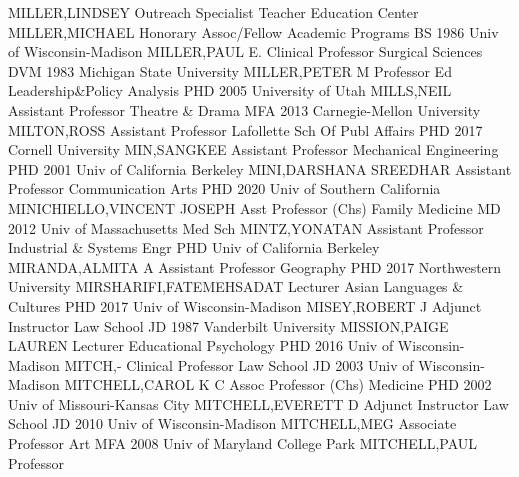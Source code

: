 \documentclass[
]{article}
\begin{document}
\textbar MILLER,LINDSEY \textbar Outreach Specialist \textbar{}
 \textbar Teacher Education Center \textbar MILLER,MICHAEL
\textbar Honorary Assoc/Fellow \textbar Academic Programs \textbar{}
 \textbar BS 1986 Univ of Wisconsin-Madison
\textbar MILLER,PAUL E. \textbar Clinical Professor \textbar Surgical
Sciences \textbar{}  \textbar DVM 1983 Michigan State
University \textbar MILLER,PETER M \textbar Professor \textbar Ed
Leadership\&Policy Analysis \textbar{}  \textbar PHD 2005
University of Utah \textbar MILLS,NEIL \textbar Assistant Professor
\textbar Theatre \& Drama \textbar{}  \textbar MFA 2013
Carnegie-Mellon University \textbar MILTON,ROSS \textbar Assistant
Professor \textbar Lafollette Sch Of Publ Affairs \textbar{}
 \textbar PHD 2017 Cornell University \textbar MIN,SANGKEE
\textbar Assistant Professor \textbar Mechanical Engineering \textbar{}
 \textbar PHD 2001 Univ of California Berkeley
\textbar MINI,DARSHANA SREEDHAR \textbar Assistant Professor
\textbar Communication Arts \textbar{}  \textbar PHD 2020
Univ of Southern California \textbar MINICHIELLO,VINCENT JOSEPH
\textbar Asst Professor (Chs) \textbar Family Medicine \textbar{}
 \textbar MD 2012 Univ of Massachusetts Med Sch
\textbar MINTZ,YONATAN \textbar Assistant Professor \textbar Industrial
\& Systems Engr \textbar{}  \textbar PHD Univ of California
Berkeley \textbar MIRANDA,ALMITA A \textbar Assistant Professor
\textbar Geography \textbar{}  \textbar PHD 2017
Northwestern University \textbar MIRSHARIFI,FATEMEHSADAT
\textbar Lecturer \textbar Asian Languages \& Cultures \textbar{}
 \textbar PHD 2017 Univ of Wisconsin-Madison
\textbar MISEY,ROBERT J \textbar Adjunct Instructor \textbar Law School
\textbar{}  \textbar JD 1987 Vanderbilt University
\textbar MISSION,PAIGE LAUREN \textbar Lecturer \textbar Educational
Psychology \textbar{}  \textbar PHD 2016 Univ of
Wisconsin-Madison \textbar MITCH,- \textbar Clinical Professor
\textbar Law School \textbar{}  \textbar JD 2003 Univ of
Wisconsin-Madison \textbar MITCHELL,CAROL K C \textbar Assoc Professor
(Chs) \textbar Medicine \textbar{}  \textbar PHD 2002 Univ
of Missouri-Kansas City \textbar MITCHELL,EVERETT D \textbar Adjunct
Instructor \textbar Law School \textbar{}  \textbar JD 2010
Univ of Wisconsin-Madison \textbar MITCHELL,MEG \textbar Associate
Professor \textbar Art \textbar{}  \textbar MFA 2008 Univ of
Maryland College Park \textbar MITCHELL,PAUL \textbar Professor
\end{document}
